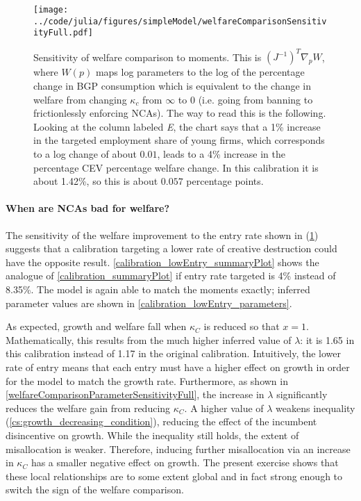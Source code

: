 \documentclass[11pt,english]{article}
\begin{document}
\begin{figure}[]
	\texttt{[image: ../code/julia/figures/simpleModel/welfareComparisonSensitivityFull.pdf]}
	\caption{Sensitivity of welfare comparison to moments. This is $(J^{-1})^T \nabla_p W$, where $W(p)$ maps log parameters to the log of the percentage change in BGP consumption which is equivalent to the change in welfare from changing $\kappa_c$ from $\infty$ to $0$ (i.e. going from banning to frictionlessly enforcing NCAs). The way to read this is the following. Looking at the column labeled \textit{E}, the chart says that a 1\% increase in the targeted employment share of young firms, which corresponds to a log change of about $0.01$, leads to a 4\% increase in the percentage CEV percentage welfare change. In this calibration it is about 1.42\%, so this is about $0.057$ percentage points.}
	\label{welfareComparisonSensitivityFull}
\end{figure}


\paragraph{When are NCAs bad for welfare?}

The sensitivity of the welfare improvement to the entry rate shown in (\ref{welfareComparisonSensitivityFull}) suggests that a calibration targeting a lower rate of creative destruction could have the opposite result. \autoref{calibration_lowEntry_summaryPlot} shows the analogue of \autoref{calibration_summaryPlot} if entry rate targeted is 4\% instead of 8.35\%. The model is again able to match the moments exactly; inferred parameter values are shown in \autoref{calibration_lowEntry_parameters}.

As expected, growth and welfare fall when $\kappa_C$ is reduced so that $x = 1$. Mathematically, this results from the much higher inferred value of $\lambda$: it is 1.65 in this calibration instead of 1.17 in the original calibration. Intuitively, the lower rate of entry means that each entry must have a higher effect on growth in order for the model to match the growth rate. Furthermore, as shown in \autoref{welfareComparisonParameterSensitivityFull}, the increase in $\lambda$ significantly reduces the welfare gain from reducing $\kappa_C$. A higher value of $\lambda$ weakens inequality (\ref{cs:growth_decreasing_condition}), reducing the effect of the incumbent disincentive on growth. While the inequality still holds, the extent of misallocation is weaker. Therefore, inducing further misallocation via an increase in $\kappa_C$ has a smaller negative effect on growth. The present exercise shows that these local relationships are to some extent global and in fact strong enough to switch the sign of the welfare comparison.
\end{document}
